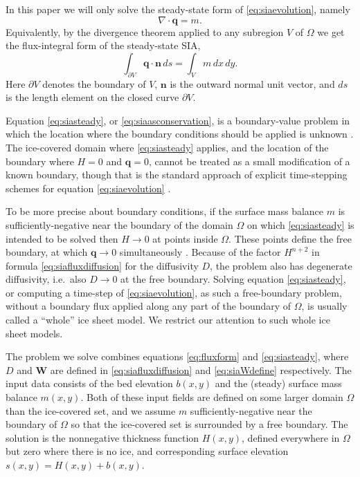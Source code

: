 \documentclass[twocolumn,letterpaper]{igs}
\newcommand\bn{\mathbf{n}}
\newcommand\bq{\mathbf{q}}
\newcommand\bW{\mathbf{W}}
\newcommand{\Div}{\nabla\cdot}
\begin{document}
In this paper we will only solve the steady-state form of \eqref{eq:siaevolution}, namely
\begin{equation}
\Div \bq = m.  \label{eq:siasteady}
\end{equation}
Equivalently, by the divergence theorem applied to any subregion $V$ of $\Omega$ we get the flux-integral form of the steady-state SIA,
\begin{equation}
  \int_{\partial V} \bq \cdot \bn\,ds = \int_V m\, dx\,dy. \label{eq:siaasconservation}
\end{equation}
Here $\partial V$ denotes the boundary of $V$, $\bn$ is the outward normal unit vector, and $ds$ is the length element on the closed curve $\partial V$.

Equation \eqref{eq:siasteady}, or \eqref{eq:siaasconservation}, is a boundary-value problem in which the location where the boundary conditions should be applied is unknown \citep{JaroschSchoofAnslow2013,JouvetBueler2012}.  The ice-covered domain where \eqref{eq:siasteady} applies, and the location of the boundary where $H=0$ and $\bq=0$, cannot be treated as a small modification of a known boundary, though that is the standard approach of explicit time-stepping schemes for equation \eqref{eq:siaevolution} \citep{Bueleretal2005,Huybrechtsetal1996}.

To be more precise about boundary conditions, if the surface mass balance $m$ is sufficiently-negative near the boundary of the domain $\Omega$ on which \eqref{eq:siasteady} is intended to be solved then $H\to 0$ at points inside $\Omega$.  These points define the free boundary, at which $\bq \to 0$ simultaneously \citep{JouvetBueler2012}.  Because of the factor $H^{n+2}$ in formula \eqref{eq:siafluxdiffusion} for the diffusivity $D$, the problem also has degenerate diffusivity, i.e.~also $D \to 0$ at the free boundary.  Solving equation \eqref{eq:siasteady}, or computing a time-step of \eqref{eq:siaevolution}, as such a free-boundary problem, without a boundary flux applied along any part of the boundary of $\Omega$, is usually called a ``whole'' ice sheet model.  We restrict our attention to such whole ice sheet models.

The problem we solve combines equations \eqref{eq:fluxform} and \eqref{eq:siasteady}, where $D$ and $\bW$ are defined in \eqref{eq:siafluxdiffusion} and \eqref{eq:siaWdefine} respectively.  The input data consists of the bed elevation $b(x,y)$ and the (steady) surface mass balance $m(x,y)$.  Both of these input fields are defined on some larger domain $\Omega$ than the ice-covered set, and we assume $m$ sufficiently-negative near the boundary of $\Omega$ so that the ice-covered set is surrounded by a free boundary.  The solution is the nonnegative thickness function $H(x,y)$, defined everywhere in $\Omega$ but zero where there is no ice, and corresponding surface elevation $s(x,y)=H(x,y)+b(x,y)$.
\end{document}
